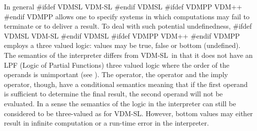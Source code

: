 \documentclass[\pformat,12pt]{article}
\newcommand{\vdmslpp}[2]{%
#ifdef VDMSL
#1
#endif VDMSL
#ifdef VDMPP
#2
#endif VDMPP
}
\newcommand{\vdmsl}{VDM-SL}
\newcommand{\vdmpp}{VDM++}
\begin{document}
In general \vdmslpp{\vdmsl}{\vdmpp} allows one to specify systems in
which computations may fail to terminate or to deliver a result. To
deal with such potential undefinedness, 
\vdmslpp{\vdmsl}{\vdmpp} employs a three valued logic: values may be
true, false or bottom (undefined). 
The semantics of the interpreter differs from \vdmsl\ in that it does
not have an LPF (Logic of Partial Functions) three valued logic where
the order of the operands is  
unimportant (see \cite{Jones90a}).  The  operator, the
 operator and the imply operator, though, have a conditional
semantics meaning that if the first operand is sufficient to determine
the final result, the second operand will not be evaluated. In a sense
the semantics of the logic in the interpreter can still be considered
to be three-valued as for VDM-SL. However, bottom values may
either result in infinite computation or a run-time error in the
interpreter.
\end{document}
